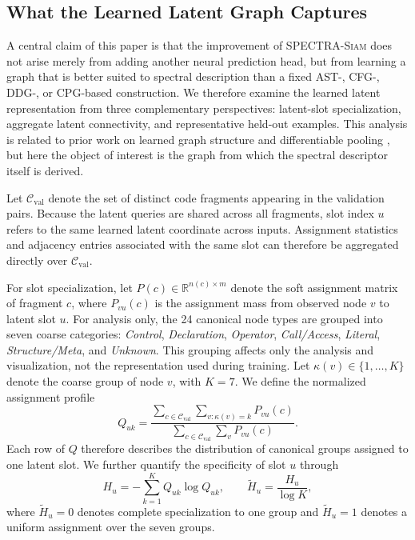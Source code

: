 \documentclass[final,5p,times,twocolumn]{elsarticle}
\newcommand{\method}{\textsc{SPECTRA-Siam}}
\theoremstyle{plain}
\begin{document}
\subsection{What the Learned Latent Graph Captures}
\label{sec:d4_latent_graph_interpretation}

A central claim of this paper is that the improvement of \method{} does not arise merely from adding another neural prediction head, but from learning a graph that is better suited to spectral description than a fixed AST-, CFG-, DDG-, or CPG-based construction. We therefore examine the learned latent representation from three complementary perspectives: latent-slot specialization, aggregate latent connectivity, and representative held-out examples. This analysis is related to prior work on learned graph structure and differentiable pooling \cite{ying2018diffpool,kipf2018nri,chen2020idgl}, but here the object of interest is the graph from which the spectral descriptor itself is derived.

Let $\mathcal{C}_{\mathrm{val}}$ denote the set of distinct code fragments appearing in the validation pairs. Because the latent queries are shared across all fragments, slot index $u$ refers to the same learned latent coordinate across inputs. Assignment statistics and adjacency entries associated with the same slot can therefore be aggregated directly over $\mathcal{C}_{\mathrm{val}}$.

For slot specialization, let
$P(c)\in\mathbb{R}^{n(c)\times m}$
denote the soft assignment matrix of fragment $c$, where $P_{vu}(c)$ is the assignment mass from observed node $v$ to latent slot $u$. For analysis only, the 24 canonical node types are grouped into seven coarse categories:
\emph{Control}, \emph{Declaration}, \emph{Operator}, \emph{Call/Access}, \emph{Literal}, \emph{Structure/Meta}, and \emph{Unknown}.
This grouping affects only the analysis and visualization, not the representation used during training.
Let $\kappa(v)\in\{1,\ldots,K\}$ denote the coarse group of node $v$, with $K=7$. We define the normalized assignment profile
\begin{equation}
Q_{uk}
=
\frac{
\displaystyle
\sum_{c\in\mathcal{C}_{\mathrm{val}}}
\sum_{v:\kappa(v)=k}
P_{vu}(c)
}{
\displaystyle
\sum_{c\in\mathcal{C}_{\mathrm{val}}}
\sum_v P_{vu}(c)
}.
\label{eq:d4_slot_profile}
\end{equation}
Each row of $Q$ therefore describes the distribution of canonical groups assigned to one latent slot. We further quantify the specificity of slot $u$ through
\begin{equation}
H_u
=
-\sum_{k=1}^{K}Q_{uk}\log Q_{uk},
\qquad
\widetilde{H}_u
=
\frac{H_u}{\log K},
\label{eq:d4_slot_entropy}
\end{equation}
where $\widetilde{H}_u=0$ denotes complete specialization to one group and $\widetilde{H}_u=1$ denotes a uniform assignment over the seven groups.
\end{document}
